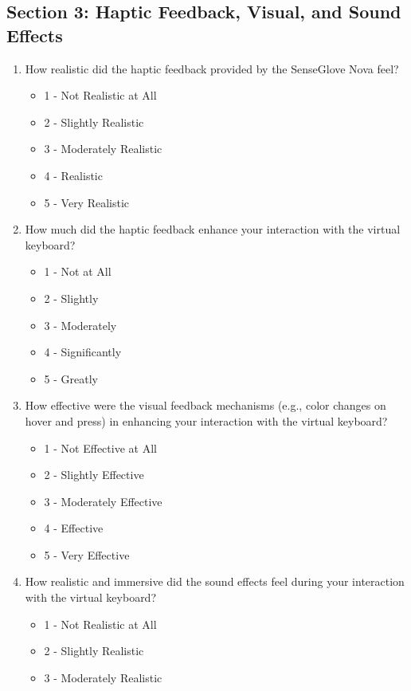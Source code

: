 \subsection{Section 3: Haptic Feedback, Visual, and Sound Effects}
\begin{enumerate}
    \item How realistic did the haptic feedback provided by the SenseGlove Nova feel?
    \begin{itemize}
        \item 1 - Not Realistic at All
        \item 2 - Slightly Realistic
        \item 3 - Moderately Realistic
        \item 4 - Realistic
        \item 5 - Very Realistic
    \end{itemize}
    \item How much did the haptic feedback enhance your interaction with the virtual keyboard?
    \begin{itemize}
        \item 1 - Not at All
        \item 2 - Slightly
        \item 3 - Moderately
        \item 4 - Significantly
        \item 5 - Greatly
    \end{itemize}
    \item How effective were the visual feedback mechanisms (e.g., color changes on hover and press) in enhancing your interaction with the virtual keyboard?
    \begin{itemize}
        \item 1 - Not Effective at All
        \item 2 - Slightly Effective
        \item 3 - Moderately Effective
        \item 4 - Effective
        \item 5 - Very Effective
    \end{itemize}
    \item How realistic and immersive did the sound effects feel during your interaction with the virtual keyboard?
    \begin{itemize}
        \item 1 - Not Realistic at All
        \item 2 - Slightly Realistic
        \item 3 - Moderately Realistic

\end{itemize}
\end{enumerate}

